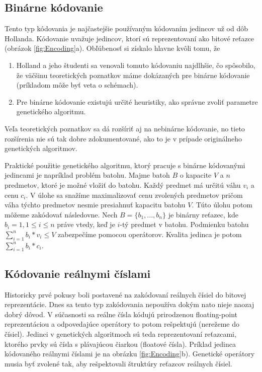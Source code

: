 \subsection{Binárne kódovanie}\label{kap2:2.2:2.2.1:Binary}
Tento typ kódovania je najčastejšie používaným kódovaním jedincov už od dôb Hollanda. Kódovanie uvažuje jedincov, ktorí sú reprezentovaní ako bitové reťazce (obrázok \ref{fig:Encoding}a). Obľúbenosť si získalo hlavne kvôli tomu, že 
\begin{enumerate}
\item Holland a jeho študenti sa venovali tomuto kódovaniu najdlhšie, čo spôsobilo, že väčšinu teoretických poznatkov máme dokázaných pre binárne kódovanie (príkladom môže byť veta o schémach).
\item Pre binárne kódovanie existujú určité heuristiky, ako správne zvoliť parametre genetického algoritmu.
\end{enumerate}
Veľa teoretických poznatkov sa dá rozšíriť aj na nebinárne kódovanie, no tieto rozšírenia nie sú tak dobre zdokumentované, ako to je v prípade originálneho genetických algoritmov.

Praktické použitie genetického algoritmu, ktorý pracuje s binárne kódovanými jedincami je napríklad problém batohu. Majme batoh $B$ o kapacite $V$ a $n$ predmetov, ktoré je možné vložiť do batohu. Každý predmet má určitú váhu $v_i$ a cenu $c_i$. V úlohe sa snažíme maximalizovať cenu zvolených predmetov pričom váha týchto predmetov nesmie presiahnuť kapacitu batohu $V$. Túto úlohu potom môžeme zakódovať následovne. Nech $B=\{b_1,...,b_n\}$ je binárny reťazec, kde $b_i = 1, 1 \leq i \leq n$ práve vtedy, keď je $i$-tý predmet v batohu. Podmienku batohu $\sum_{i=1}^{n} b_i * v_i \leq V$ zabezpečíme pomocou operátorov. Kvalita jedinca je potom $\sum_{i=1}^{n} b_i * c_i$.
\subsection{Kódovanie reálnymi číslami}\label{kap2:2.2:2.2.2:RealValued}
Historicky prvé pokusy boli postavené na zakódovaní reálnych čísiel do bitovej reprezentácie. Dnes sa tento typ zakódovania nepoužíva dokým nato nieje naozaj dobrý dôvod. V súčasnosti sa reálne čísla kódujú prirodzenou floating-point reprezentáciou a odpovedajúce operátory to potom rešpektujú (nerežeme do čísiel). Jedinci v genetických algoritmoch sú teda reprezentovaní reťazcami, ktorého prvky sú čísla s plávajúcou čiarkou (floatové čísla).
Príklad jedinca kódovaného reálnymi číslami je na obrázku \ref{fig:Encoding}b). Genetické operátory musia byť zvolené tak, aby rešpektovali štruktúry reťazcov reálnych čísiel.


